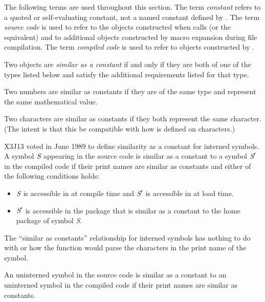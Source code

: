 The following terms are used throughout this section.
  The term \emph{constant} refers to a quoted or self-evaluating constant,
  not a named constant defined by .
  The term \emph{source code} is used to refer to the objects constructed
  when  calls  (or the equivalent) and to
  additional objects constructed by
  macro expansion during file compilation.
  The term \emph{compiled code} is used to refer to objects constructed by 
  .

Two objects are \emph{similar as a constant} if and only if
they are both of one of the types listed below and satisfy the
additional requirements listed for that type.

\begin{flushdesc}
\item[\cdf{number}]

  Two numbers are similar as constants if they are of the same type
  and represent the same mathematical value.
  
\item[\cdf{character}]

  Two characters are similar as constants if they both represent
  the same character.  (The intent is that this be compatible with
  how  is defined on characters.)

\item[\cdf{symbol}]
  X3J13 voted in June 1989 
  to define similarity as a constant for interned symbols.
  A symbol $\emph{S}$ appearing in the source code is similar as a constant to 
  a symbol $\emph{S}'$ in the compiled code if their print names are similar as constants
   and either of the following conditions holds:
\begin{itemize}
\item  $\emph{S}$ is accessible in  at compile time and $\emph{S}'$ is accessible in
        at load time.
\item  $\emph{S}'$ is accessible in the package that is similar as a constant to the
       home package of symbol \emph{S}.
\end{itemize}
  The ``similar as constants'' relationship for interned symbols has nothing
  to do with  or how the function  would parse the 
  characters in the print name of the symbol.

  An uninterned symbol in the source code is similar as a constant
  to an uninterned symbol in the compiled code if their print names
  are similar as constants.


\end{flushdesc}
